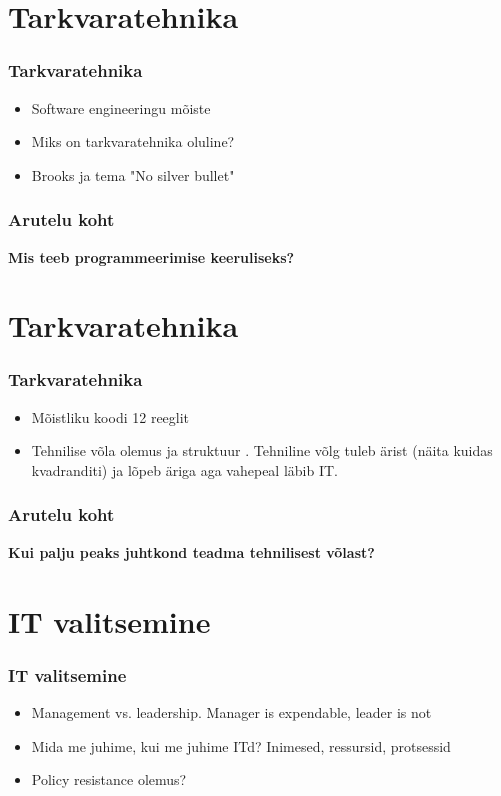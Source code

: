 \section{Tarkvaratehnika}
\begin{frame}[fragile]
  \frametitle{Tarkvaratehnika}
	\begin{itemize}
		\item Software engineeringu mõiste
		\item Miks on tarkvaratehnika oluline? \cite{spolsky2004joel2}
		\item Brooks ja tema "No silver bullet" \cite{brooks1975mythical}
	\end{itemize}
\end{frame}


\begin{frame}[fragile]
  \frametitle{Arutelu koht}
		\begin{center}
			\textbf{Mis teeb programmeerimise keeruliseks?}
		\end{center}
\end{frame}

\section{Tarkvaratehnika}
\begin{frame}[fragile]
  \frametitle{Tarkvaratehnika}
	\begin{itemize}
		\item Mõistliku koodi 12 reeglit \cite{spolsky2004joel}
		\item Tehnilise võla olemus ja struktuur \cite{fowlerdebt}. Tehniline võlg tuleb ärist (näita kuidas kvadranditi) ja lõpeb äriga aga vahepeal läbib IT.
	\end{itemize}
\end{frame}

\begin{frame}[fragile]
  \frametitle{Arutelu koht}
		\begin{center}
			\textbf{Kui palju peaks juhtkond teadma tehnilisest võlast?}
		\end{center}
\end{frame}

\section{IT valitsemine}
\begin{frame}[fragile]
  \frametitle{IT valitsemine}
	\begin{itemize}
		\item Management vs. leadership. Manager is expendable, leader is not
		\item Mida me juhime, kui me juhime ITd? Inimesed, ressursid, protsessid
		\item Policy resistance olemus?
	\end{itemize}
\end{frame}

